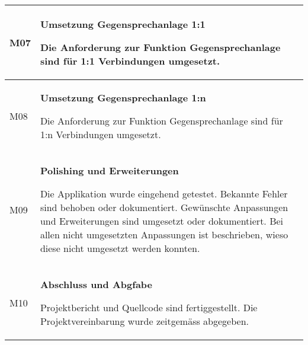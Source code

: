 \begin{table}[h]
\begin{tabular}{|l|p{15cm}|}
        M07         & \textbf{Umsetzung Gegensprechanlage 1:1}

        Die Anforderung zur Funktion Gegensprechanlage sind für 1:1 Verbindungen umgesetzt. \\
        \hline

        M08         & \textbf{Umsetzung Gegensprechanlage 1:n}

        Die Anforderung zur Funktion Gegensprechanlage sind für 1:n Verbindungen umgesetzt. \\
        \hline

        M09         & \textbf{Polishing und Erweiterungen}

        Die Applikation wurde eingehend getestet.
        Bekannte Fehler sind behoben oder dokumentiert.
        Gewünschte Anpassungen und Erweiterungen sind umgesetzt oder dokumentiert.
        Bei allen nicht umgesetzten Anpassungen ist beschrieben, wieso diese nicht umgesetzt werden konnten.
        \\
        \hline

        M10         & \textbf{Abschluss und Abgfabe}

        Projektbericht und Quellcode sind fertiggestellt.
        Die Projektvereinbarung wurde zeitgemäss abgegeben.\\
        \hline
    \end{tabular}\label{tab:milestones}
\end{table}

\clearpage
